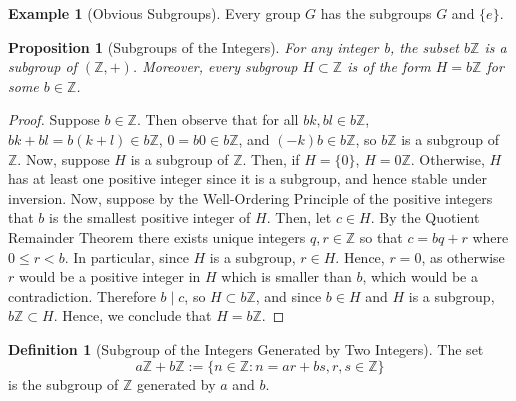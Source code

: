 \documentclass[12pt]{article}
\newtheorem{prop}[thm]{Proposition}
\theoremstyle{definition}
\newtheorem{defn}[thm]{Definition}
\newtheorem{eg}[thm]{Example}
\theoremstyle{remark}
\numberwithin{equation}{section}
\newcommand\Z{\mathbb Z}    %
\begin{document}
\vspace{15pt}

\begin{eg}[Obvious Subgroups]
        Every group $G$ has the subgroups $G$ and $\{e\}$.
\end{eg}

\vspace{15pt}

\begin{prop}[Subgroups of the Integers]
        For any integer b, the subset $b\Z$ is a subgroup of $(\Z,+)$. Moreover, every subgroup $H \subset \Z$ is of the form $H = b\Z$ for some $b \in \Z$.
\end{prop}
\begin{proof}
        Suppose $b \in \Z$. Then observe that for all $bk,bl \in b\Z$, $bk+bl = b(k+l) \in b\Z$, $0 = b0 \in b\Z$, and $(-k)b \in b\Z$, so $b\Z$ is a subgroup of $\Z$. Now, suppose $H$ is a subgroup of $\Z$. Then, if $H = \{0\}$, $H = 0\Z$. Otherwise, $H$ has at least one positive integer since it is a subgroup, and hence stable under inversion. Now, suppose by the Well-Ordering Principle of the positive integers that $b$ is the smallest positive integer of $H$. Then, let $c \in H$. By the Quotient Remainder Theorem there exists unique integers $q,r \in \Z$ so that $c = bq + r$ where $0 \leq r < b$. In particular, since $H$ is a subgroup, $r \in H$. Hence, $r=0$, as otherwise $r$ would be a positive integer in $H$ which is smaller than $b$, which would be a contradiction. Therefore $b \;\vert\;c$, so $H \subset b\Z$, and since $b \in H$ and $H$ is a subgroup, $b\Z \subset H$. Hence, we conclude that $H = b\Z$.
\end{proof}

\vspace{15pt}

\begin{defn}[Subgroup of the Integers Generated by Two Integers]
        The set \begin{equation}
                a\Z + b\Z := \{n \in \Z: n =ar + bs, r,s \in \Z\}
        \end{equation}
        is the subgroup of $\Z$ generated by $a$ and $b$.
\end{defn}

\vspace{15pt}
\end{document}
